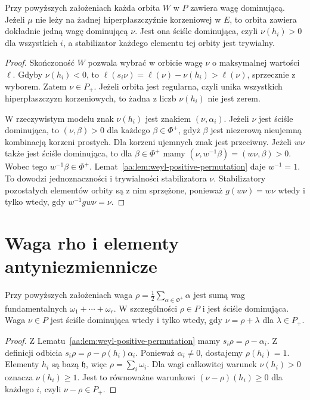 \begin{lemat}
\label{aa:lem:weyl-regular-orbits}
Przy powyższych założeniach każda orbita $W$ w $P$ zawiera wagę dominującą. Jeżeli $\mu$ nie leży na żadnej hiperpłaszczyźnie korzeniowej w $E$, to orbita zawiera dokładnie jedną wagę dominującą $\nu$. Jest ona ściśle dominująca, czyli $\nu(h_i)>0$ dla wszystkich $i$, a stabilizator każdego elementu tej orbity jest trywialny.
\end{lemat}
\begin{proof}
Skończoność $W$ pozwala wybrać w orbicie wagę $\nu$ o maksymalnej wartości $\ell$. Gdyby $\nu(h_i)<0$, to $\ell(s_i\nu)=\ell(\nu)-\nu(h_i)>\ell(\nu)$, sprzecznie z wyborem. Zatem $\nu\in P_+$. Jeżeli orbita jest regularna, czyli unika wszystkich hiperpłaszczyzn korzeniowych, to żadna z liczb $\nu(h_i)$ nie jest zerem.

W rzeczywistym modelu znak $\nu(h_i)$ jest znakiem $(\nu,\alpha_i)$. Jeżeli $\nu$ jest ściśle dominująca, to $(\nu,\beta)>0$ dla każdego $\beta\in\Phi^+$, gdyż $\beta$ jest niezerową nieujemną kombinacją korzeni prostych. Dla korzeni ujemnych znak jest przeciwny. Jeżeli $w\nu$ także jest ściśle dominująca, to dla $\beta\in\Phi^+$ mamy $(\nu,w^{-1}\beta)=(w\nu,\beta)>0$. Wobec tego $w^{-1}\beta\in\Phi^+$. Lemat~\ref{aa:lem:weyl-positive-permutation} daje $w^{-1}=1$. To dowodzi jednoznaczności i trywialności stabilizatora $\nu$. Stabilizatory pozostałych elementów orbity są z nim sprzężone, ponieważ $g(w\nu)=w\nu$ wtedy i tylko wtedy, gdy $w^{-1}gw\nu=\nu$.
\end{proof}

\section{Waga rho i elementy antyniezmiennicze}

\begin{lemat}
\label{aa:lem:weyl-rho}
Przy powyższych założeniach waga $\rho=\frac12\sum_{\alpha\in\Phi^+}\alpha$ jest sumą wag fundamentalnych $\omega_1+\cdots+\omega_r$. W szczególności $\rho\in P$ i jest ściśle dominująca. Waga $\nu\in P$ jest ściśle dominująca wtedy i tylko wtedy, gdy $\nu=\rho+\lambda$ dla $\lambda\in P_+$.
\end{lemat}
\begin{proof}
Z Lematu~\ref{aa:lem:weyl-positive-permutation} mamy $s_i\rho=\rho-\alpha_i$. Z definicji odbicia $s_i\rho=\rho-\rho(h_i)\alpha_i$. Ponieważ $\alpha_i\ne0$, dostajemy $\rho(h_i)=1$. Elementy $h_i$ są bazą $\mathfrak h$, więc $\rho=\sum_i\omega_i$. Dla wagi całkowitej warunek $\nu(h_i)>0$ oznacza $\nu(h_i)\ge1$. Jest to równoważne warunkowi $(\nu-\rho)(h_i)\ge0$ dla każdego $i$, czyli $\nu-\rho\in P_+$.
\end{proof}

